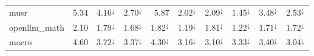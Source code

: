 {\begin{tabular}{lrrrrrrrrr}
musr & 5.34 & 4.16$^{\downarrow}$ & 2.70$^{\downarrow}$ & 5.87 & 2.02$^{\downarrow}$ & 2.09$^{\downarrow}$ & 1.45$^{\downarrow}$ & 3.48$^{\downarrow}$ & 2.53$^{\downarrow}$ \\
openllm\_math & 2.10 & 1.79$^{\downarrow}$ & 1.68$^{\downarrow}$ & 1.82$^{\downarrow}$ & 1.19$^{\downarrow}$ & 1.81$^{\downarrow}$ & 1.22$^{\downarrow}$ & 1.71$^{\downarrow}$ & 1.72$^{\downarrow}$ \\
\midrule
macro & 4.60 & 3.72$^{\downarrow}$ & 3.37$^{\downarrow}$ & 4.30$^{\downarrow}$ & 3.16$^{\downarrow}$ & 3.10$^{\downarrow}$ & 3.33$^{\downarrow}$ & 3.40$^{\downarrow}$ & 3.04$^{\downarrow}$ \\
\bottomrule
\end{tabular}}
